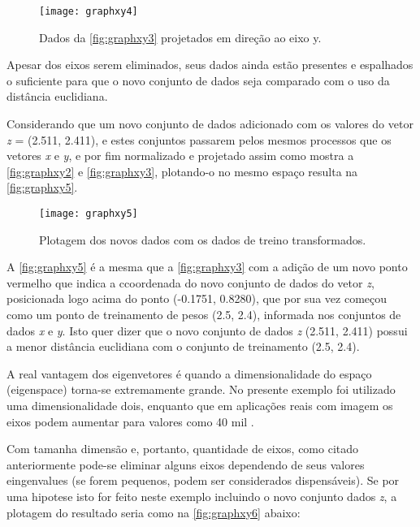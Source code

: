 \begin{figure}[h]
	\centering
	\texttt{[image: graphxy4]}
	\caption{Dados da \autoref{fig:graphxy3} projetados em direção ao eixo y.}
	\label{fig:graphxy4}
\end{figure}


Apesar dos eixos serem eliminados, seus dados ainda estão presentes e espalhados o suficiente para que o novo conjunto de dados seja comparado com o uso da distância euclidiana.

Considerando que um novo conjunto de dados adicionado com os valores do vetor \textit{z} = (2.511, 2.411), e estes conjuntos passarem pelos mesmos processos que os vetores \textit{x} e \textit{y}, e por fim normalizado e projetado assim como mostra a \autoref{fig:graphxy2} e \autoref{fig:graphxy3}, plotando-o no mesmo espaço resulta na \autoref{fig:graphxy5}.

\begin{figure}[h]
	\centering
	\texttt{[image: graphxy5]}
	\caption{Plotagem dos novos dados com os dados de treino transformados.}
	\label{fig:graphxy5}
\end{figure}

A \autoref{fig:graphxy5} é a mesma que a \autoref{fig:graphxy3} com a adição de um novo ponto vermelho que indica a ccoordenada do novo conjunto de dados do vetor \textit{z}, posicionada logo acima do ponto (-0.1751, 0.8280), que por sua vez começou como um ponto de treinamento de pesos (2.5, 2.4), informada nos conjuntos de dados \textit{x} e \textit{y}. Isto quer dizer que o novo conjunto de dados \textit{z} (2.511, 2.411) possui a menor distância euclidiana com o conjunto de treinamento (2.5, 2.4). 

A real vantagem dos eigenvetores é quando a dimensionalidade do espaço (eigenspace) torna-se extremamente grande. No presente exemplo foi utilizado uma dimensionalidade dois, enquanto que em aplicações reais com imagem os eixos podem aumentar para valores como 40 mil \cite{drmathew_java_programming}.

Com tamanha dimensão e, portanto, quantidade de eixos, como citado anteriormente pode-se eliminar alguns eixos dependendo de seus valores eingenvalues (se forem pequenos, podem ser considerados dispensáveis). Se por uma hipotese isto for feito neste exemplo incluindo o novo conjunto dados \textit{z}, a plotagem do resultado seria como na \autoref{fig:graphxy6} abaixo:


